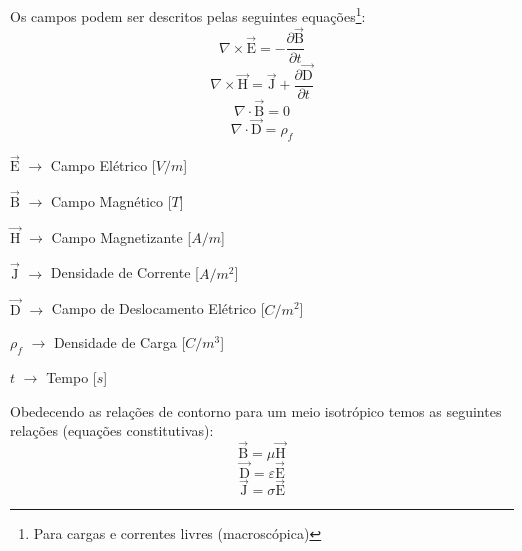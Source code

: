         Os campos podem ser descritos pelas seguintes equações\footnote{Para cargas e correntes livres
        (macroscópica)}:
            \begin{equation}
                \label{rot_elet_max}
                \nabla \times \vec{\textrm{E}}=-\frac{\partial \vec{\textrm{B}}}{\partial t} 
            \end{equation}
            \begin{equation}
                \label{rot_mag_max}
                \nabla \times \vec{\textrm{H}} = \vec{\textrm{J}} + \frac{\partial \vec{\textrm{D}}}{\partial t}
            \end{equation}
            \begin{equation}
                \nabla \cdot \vec{\textrm{B}} = 0
            \end{equation}
            \begin{equation}
                \label{div_d}
                \nabla \cdot \vec{\textrm{D}} = \rho_f
            \end{equation}

            $\vec{\textrm{E}}$ $\rightarrow$ Campo Elétrico [$V/m$]
	    
            $\vec{\textrm{B}}$ $\rightarrow$ Campo Magnético [$T$]
	    
            $\vec{\textrm{H}}$ $\rightarrow$ Campo Magnetizante [$A/m$]
	    
            $\vec{\textrm{J}}$ $\rightarrow$ Densidade de Corrente [$A/m^2$]
	    
            $\vec{\textrm{D}}$ $\rightarrow$ Campo de Deslocamento Elétrico [$C/m^2$]
	    
            $\rho_f$ $\rightarrow$ Densidade de Carga [$C/m^3$]
	    
            $t$ $\rightarrow$ Tempo [$s$]

            Obedecendo as relações de contorno para um meio isotrópico temos as seguintes
            relações (equações constitutivas):
            \begin{equation}
                \label{con_B}
                \vec{\textrm{B}} = \mu \vec{\textrm{H}}
            \end{equation}
            \begin{equation}
                \label{con_D}
                \vec{\textrm{D}} = \varepsilon  \vec{\textrm{E}}
            \end{equation}
            \begin{equation}
                \label{con_J}
                \vec{\textrm{J}} = \sigma \vec{\textrm{E}}
            \end{equation}
	    
